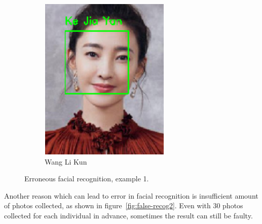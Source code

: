 \begin{figure}[!htb]
\begin{subfigure}[b]{0.3\linewidth}
    \includegraphics[width=\linewidth]{figures/false-recog-error1.png}
    \caption{Wang Li Kun}
  \end{subfigure}
  \caption{Erroneous facial recognition, example 1.}
  \label{fig:false-recog1}
\end{figure}

Another reason which can lead to error in facial recognition is insufficient amount of photos collected,
as shown in figure~\ref{fig:false-recog2}. Even with 30 photos collected for each individual in advance,
sometimes the result can still be faulty.%
\vspace{0.2cm}

